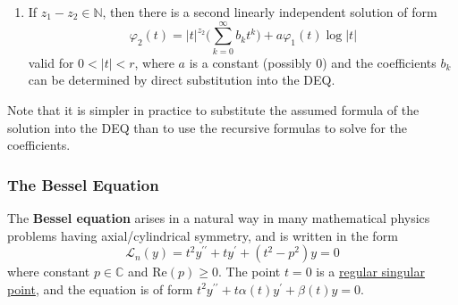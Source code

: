 \documentclass{article}
\newcounter{theorem}[section]
\newcounter{definition}[section]
\begin{document}
\begin{theorem}
\begin{enumerate}
\begin{equation}
            \varphi_2 (t) = |t|^{z_1 + 1} \bigg( \sum_{k=0}^\infty b_k t^k\bigg) + \varphi_1 (t) \log{|t|}
          \end{equation}
          valid for $0<|t|<r$, whose coefficients $b_k$ can be determined by direct substitution into the DEQ. 
          \item If $z_1 - z_2 \in \mathbb{N}$, then there is a second linearly independent solution of form 
          \begin{equation}
            \varphi_2 (t) = |t|^{z_2} \bigg( \sum_{k=0}^\infty b_k t^k \bigg) + a \varphi_1 (t) \log{|t|}
          \end{equation}
          valid for $0<|t|<r$, where $a$ is a constant (possibly $0$) and the coefficients $b_k$ can be determined by direct substitution into the DEQ. 
      \end{enumerate}
      \end{theorem}

      Note that it is simpler in practice to substitute the assumed formula of the solution into the DEQ than to use the recursive formulas to solve for the coefficients. 

    \subsubsection{The Bessel Equation}

      \begin{definition}
        \label{def:bessel-equation}
      The \textbf{Bessel equation} arises in a natural way in many mathematical physics problems having axial/cylindrical symmetry, and is written in the form 
      \begin{equation}
        \mathcal{L}_n (y) = t^2 y^{\prime\prime} + t y^\prime + (t^2 - p^2) y = 0
      \end{equation}
      where constant $p \in \mathbb{C}$ and Re$(p) \geq 0$. The point $t = 0$ is a \hyperref[def:regular-singular-point]{regular singular point}, and the equation is of form $t^2 y^{\prime\prime} + t \alpha(t) y^\prime + \beta(t) y = 0$. 
      \end{definition}
\end{document}
